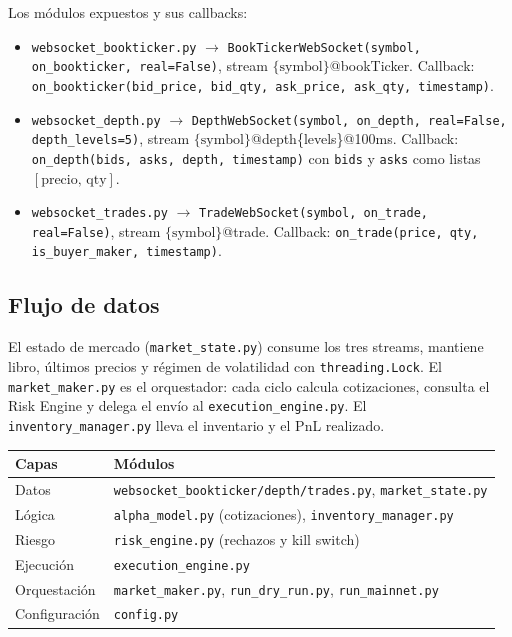 \documentclass[11pt,a4paper]{article}
\newcommand{\codigo}[1]{\texttt{#1}}
\begin{document}
Los módulos expuestos y sus callbacks:
\begin{itemize}
  \item \codigo{websocket\_bookticker.py} $\rightarrow$
  \codigo{BookTickerWebSocket(symbol, on\_bookticker, real=False)},
  stream $\{\text{symbol}\}$@bookTicker. Callback:
  \codigo{on\_bookticker(bid\_price, bid\_qty, ask\_price, ask\_qty, timestamp)}.
  \item \codigo{websocket\_depth.py} $\rightarrow$
  \codigo{DepthWebSocket(symbol, on\_depth, real=False, depth\_levels=5)},
  stream $\{\text{symbol}\}$@depth\{levels\}@100ms. Callback:
  \codigo{on\_depth(bids, asks, depth, timestamp)} con \codigo{bids} y
  \codigo{asks} como listas $[\text{precio},\,\text{qty}]$.
  \item \codigo{websocket\_trades.py} $\rightarrow$
  \codigo{TradeWebSocket(symbol, on\_trade, real=False)}, stream
  $\{\text{symbol}\}$@trade. Callback:
  \codigo{on\_trade(price, qty, is\_buyer\_maker, timestamp)}.
\end{itemize}

\subsection{Flujo de datos}
El estado de mercado (\codigo{market\_state.py}) consume los tres
streams, mantiene libro, últimos precios y régimen de volatilidad con
\codigo{threading.Lock}. El \codigo{market\_maker.py} es el orquestador:
cada ciclo calcula cotizaciones, consulta el Risk Engine y delega el
envío al \codigo{execution\_engine.py}. El
\codigo{inventory\_manager.py} lleva el inventario y el PnL realizado.

\begin{center}
\begin{tabular}{ll}
\toprule
\textbf{Capas} & \textbf{Módulos} \\
\midrule
Datos & \codigo{websocket\_bookticker/depth/trades.py}, \codigo{market\_state.py} \\
Lógica & \codigo{alpha\_model.py} (cotizaciones), \codigo{inventory\_manager.py} \\
Riesgo & \codigo{risk\_engine.py} (rechazos y kill switch) \\
Ejecución & \codigo{execution\_engine.py} \\
Orquestación & \codigo{market\_maker.py}, \codigo{run\_dry\_run.py}, \codigo{run\_mainnet.py} \\
Configuración & \codigo{config.py} \\
\bottomrule
\end{tabular}
\end{center}
\end{document}
